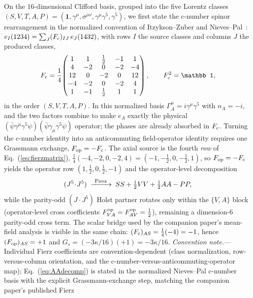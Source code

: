\documentclass[aps,prd,twocolumn,superscriptaddress,showpacs,preprintnumbers,nofootinbib,longbibliography,floatfix]{revtex4-2}
\begin{document}
On the $16$-dimensional Clifford basis, grouped into the five Lorentz classes
$(S,V,T,A,P)=(\mathbf 1,\gamma^\mu,\sigma^{\mu\nu},\gamma^\mu\gamma^5,\gamma^5)$,
we first state the c-number spinor rearrangement in the normalized
convention of Itzykson--Zuber and
Nieves--Pal~\cite{ItzyksonZuber,NievesPal2004}:
$e_I(1234)=\sum_J(F_{\rm c})_{IJ}\,e_J(1432)$, with rows $I$ the source
classes and columns $J$ the produced classes,
\begin{equation}\label{eq:fierzmatrix}
F_{\rm c}=\frac14\!\begin{pmatrix}
1&1&\tfrac12&-1&1\\
4&-2&0&-2&-4\\
12&0&-2&0&12\\
-4&-2&0&-2&4\\
1&-1&\tfrac12&1&1
\end{pmatrix},\qquad F_{\rm c}^{2}=\mathbb 1,
\end{equation}
in the order $(S,V,T,A,P)$. In this normalized basis
$\Gamma_A^\mu=i\gamma^\mu\gamma^5$ with $n_A=-i$, and the two factors
combine to make $e_A$ exactly the physical
$(\bar\psi\gamma^\mu\gamma^5\psi)(\bar\psi\gamma_\mu\gamma^5\psi)$
operator; the phases are already absorbed in $F_{\rm c}$. Turning the
c-number identity into an anticommuting field-operator identity requires
one Grassmann exchange, $F_{\rm op}=-F_{\rm c}$. The axial source is the
fourth \emph{row} of Eq.~(\ref{eq:fierzmatrix}),
$\tfrac14(-4,-2,0,-2,4)=(-1,-\tfrac12,0,-\tfrac12,1)$, so
$F_{\rm op}=-F_{\rm c}$ yields the operator row
$(1,\tfrac12,0,\tfrac12,-1)$ and the operator-level decomposition
\begin{equation}\label{eq:AAdecomp}
(J^5\!\cdot\!J^5)\;\xrightarrow{\ \rm Fierz\ }\;
SS+\tfrac12 VV+\tfrac12 AA-PP,
\end{equation}
while the parity-odd $(J\!\cdot\!J^5)$ Holst partner rotates only within the
$\{V,A\}$ block (operator-level cross coefficients
$F^{\rm op}_{VA}=F^{\rm op}_{AV}=\tfrac12$), remaining a dimension-$6$
parity-odd cross term. The scalar bridge used by the companion paper's
mean-field analysis is visible in the same chain:
$(F_{\rm c})_{AS}=\tfrac14(-4)=-1$, hence
$(F_{\rm op})_{AS}=+1$ and $G_s=(-3\kappa/16)(+1)=-3\kappa/16$.
\emph{Convention note.}---Individual Fierz coefficients are
convention-dependent (class normalization, row-versus-column orientation,
and the c-number-versus-anticommuting-operator map); Eq.~(\ref{eq:AAdecomp})
is stated in the normalized Nieves--Pal c-number basis with the explicit
Grassmann-exchange step, matching the companion paper's published Fierz
\end{document}
